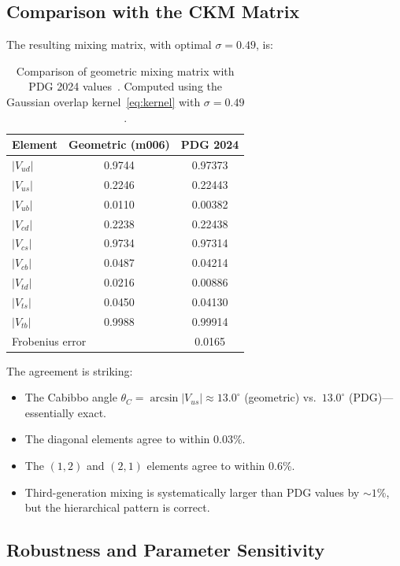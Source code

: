 \documentclass[11pt,a4paper]{article}
\begin{document}
\subsection{Comparison with the CKM Matrix}
\label{subsec:comparison}

The resulting mixing matrix, with optimal $\sigma = 0.49$, is:

\begin{table}[h]
\centering
\begin{tabular}{lcc}
\toprule
Element & Geometric (m006) & PDG 2024 \\
\midrule
$|V_{ud}|$ & 0.9744 & 0.97373 \\
$|V_{us}|$ & 0.2246 & 0.22443 \\
$|V_{ub}|$ & 0.0110 & 0.00382 \\
$|V_{cd}|$ & 0.2238 & 0.22438 \\
$|V_{cs}|$ & 0.9734 & 0.97314 \\
$|V_{cb}|$ & 0.0487 & 0.04214 \\
$|V_{td}|$ & 0.0216 & 0.00886 \\
$|V_{ts}|$ & 0.0450 & 0.04130 \\
$|V_{tb}|$ & 0.9988 & 0.99914 \\
\midrule
\multicolumn{2}{l}{Frobenius error} & 0.0165 \\
\bottomrule
\end{tabular}
\caption{Comparison of geometric mixing matrix with PDG 2024 values~\cite{PDG2024}. Computed using the Gaussian overlap kernel~\eqref{eq:kernel} with $\sigma = 0.49$.}
\label{tab:ckm_comparison}
\end{table}

The agreement is striking:
\begin{itemize}
\item The Cabibbo angle $\theta_C = \arcsin|V_{us}| \approx 13.0^\circ$ 
(geometric) vs.\ $13.0^\circ$ (PDG)---essentially exact.

\item The diagonal elements agree to within 0.03\%.

\item The $(1,2)$ and $(2,1)$ elements agree to within 0.6\%.

\item Third-generation mixing is systematically larger than PDG values 
by $\sim 1$\%, but the hierarchical pattern is correct.
\end{itemize}

\subsection{Robustness and Parameter Sensitivity}
\label{subsec:robustness}
\end{document}
